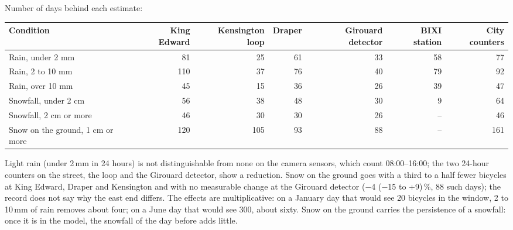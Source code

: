 \documentclass[11pt,a4paper]{article}
\begin{document}
Number of days behind each estimate:
\begin{center}\footnotesize\begin{tabular}{@{}p{4.6cm}rrrrrr@{}}\toprule
Condition & King Edward & Kensington loop & Draper & Girouard detector & BIXI station & City counters\\\midrule
Rain, under 2 mm & 81 & 25 & 61 & 33 & 58 & 77 \\
Rain, 2 to 10 mm & 110 & 37 & 76 & 40 & 79 & 92 \\
Rain, over 10 mm & 45 & 15 & 36 & 26 & 39 & 47 \\
Snowfall, under 2 cm & 56 & 38 & 48 & 30 & 9 & 64 \\
Snowfall, 2 cm or more & 46 & 30 & 30 & 26 & -- & 46 \\
Snow on the ground, 1 cm or more & 120 & 105 & 93 & 88 & -- & 161 \\
\bottomrule\end{tabular}\end{center}
Light rain (under 2\,mm in 24 hours) is not distinguishable from none on the camera sensors, which count 08:00--16:00; the two 24-hour counters on the street, the loop and the Girouard detector, show a reduction. Snow on the ground goes with a third to a half fewer bicycles at King Edward, Draper and Kensington and with no measurable change at the Girouard detector ($-$4 ($-$15 to +9)\,\%, 88 such days); the record does not say why the east end differs. The effects are multiplicative: on a January day that would see 20 bicycles in the window, 2 to 10\,mm of rain removes about four; on a June day that would see 300, about sixty. Snow on the ground carries the persistence of a snowfall: once it is in the model, the snowfall of the day before adds little.
\end{document}
